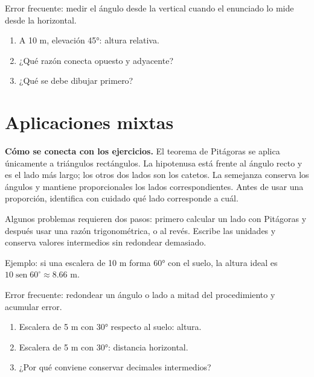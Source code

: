 \documentclass[10pt,oneside,openany]{book}
\newcommand{\sen}{\operatorname{sen}}\newcommand{\Prob}{\operatorname{P}}
\begin{document}
\begin{ojo}
Error frecuente: medir el ángulo desde la vertical cuando el enunciado lo mide desde la horizontal.
\end{ojo}

\begin{practica}

\begin{enumerate}

\item A 10 m, elevación 45°: altura relativa.

\item ¿Qué razón conecta opuesto y adyacente?

\item ¿Qué se debe dibujar primero?

\end{enumerate}

\end{practica}



\section{Aplicaciones mixtas}

\textbf{Cómo se conecta con los ejercicios.} El teorema de Pitágoras se aplica únicamente a triángulos rectángulos. La hipotenusa está frente al ángulo recto y es el lado más largo; los otros dos lados son los catetos. La semejanza conserva los ángulos y mantiene proporcionales los lados correspondientes. Antes de usar una proporción, identifica con cuidado qué lado corresponde a cuál.

Algunos problemas requieren dos pasos: primero calcular un lado con Pitágoras y después usar una razón trigonométrica, o al revés. Escribe las unidades y conserva valores intermedios sin redondear demasiado.

\begin{ejemplo}
Ejemplo: si una escalera de 10 m forma 60° con el suelo, la altura ideal es $10\sen60^\circ\approx8.66$ m.
\end{ejemplo}

\begin{ojo}
Error frecuente: redondear un ángulo o lado a mitad del procedimiento y acumular error.
\end{ojo}

\begin{practica}

\begin{enumerate}

\item Escalera de 5 m con 30° respecto al suelo: altura.

\item Escalera de 5 m con 30°: distancia horizontal.

\item ¿Por qué conviene conservar decimales intermedios?

\end{enumerate}

\end{practica}
\end{document}
